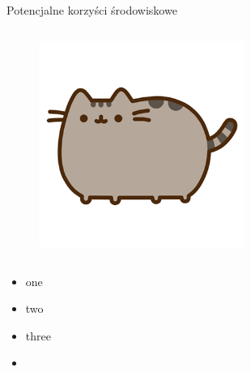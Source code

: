 \begin{columnframe}{Potencjalne korzyści środowiskowe}
    \begin{column}{0.5\textwidth}
        \begin{figure}
            \centering
            \includegraphics[width=0.6\textwidth, frame]{images/pusheen.png}
        \end{figure}
    \end{column}
    \begin{column}{0.5\textwidth}
        \begin{itemize}
            \item one \keV
            \item two \MeV
            \item three \GeV
            \item \aegis
        \end{itemize}
    \end{column}
\end{columnframe}

